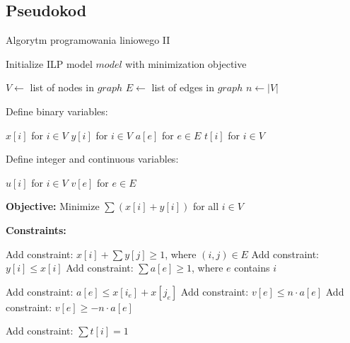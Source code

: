 \subsection{Pseudokod}
\begin{algorithm}
    \caption*{Algorytm programowania liniowego II}
    \begin{algorithmic}[1]
            \State Initialize ILP model $model$ with minimization objective
    
            \State $V \gets$ list of nodes in $graph$
            \State $E \gets$ list of edges in $graph$
            \State $n \gets |V|$ 
    
            \State Define binary variables:

            \State $x[i]$ for $i \in V$ 
            \State $y[i]$ for $i \in V$ 
            \State $a[e]$ for $e \in E$ 
            \State $t[i]$ for $i \in V$ 

    
            \State Define integer and continuous variables:

            \State $u[i]$ for $i \in V$ 
            \State $v[e]$ for $e \in E$ 


            \State \textbf{Objective:}
            \State Minimize $\sum (x[i] + y[i])$ for all $i \in V$
    
            \State \textbf{Constraints:}
    
             
                \State Add constraint: $x[i] + \sum y[j] \geq 1$, where $(i,j) \in E$
                \State Add constraint: $y[i] \leq x[i]$
                \State Add constraint: $\sum a[e] \geq 1$, where $e$ contains $i$
            \EndFor
    
                \State Add constraint: $a[e] \leq x[i_e] + x[j_e]$
                \State Add constraint: $v[e] \leq n \cdot a[e]$
                \State Add constraint: $v[e] \geq -n \cdot a[e]$
            \EndFor
    
            \State Add constraint: $\sum t[i] = 1$ 
    

\end{algorithmic}
\end{algorithm}
